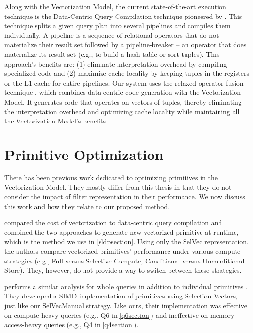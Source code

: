 \documentclass[12pt]{cmuthesis}
\begin{document}
Along with the Vectorization Model, the current state-of-the-art execution technique is the Data-Centric Query Compilation technique pioneered by \citeauthor{hyper_llvm} \cite{hyper_llvm}.  This technique splits a given query plan into several pipelines and compiles them individually. A pipeline is a sequence of relational operators that do not materialize their result set followed by a pipeline-breaker -- an operator that does materialize its result set (e.g., to build a hash table or sort tuples). This approach's benefits are: (1) eliminate interpretation overhead by compiling specialized code and (2) maximize cache locality by keeping tuples in the registers or the L1 cache for entire pipelines. Our system uses the relaxed operator fusion technique \cite{rof}, which combines data-centric code generation with the Vectorization Model. It generates code that operates on vectors of tuples, thereby eliminating the interpretation overhead and optimizing cache locality while maintaining all the Vectorization Model's benefits.


\section{Primitive Optimization}
There has been previous work dedicated to optimizing primitives in the Vectorization Model. They mostly differ from this thesis in that they do not consider the impact of filter representation in their performance. We now discuss this work and how they relate to our proposed method.
 
\citeauthor{sompolski_vec} compared the cost of vectorization to data-centric query compilation \cite{sompolski_vec} and combined the two approaches to generate new vectorized primitive at runtime, which is the method we use in \cref{sldpsection}. Using only the SelVec representation, the authors compare vectorized primitives' performance under various compute strategies (e.g., Full versus Selective Compute, Conditional versus Unconditional Store). They, however, do not provide a way to switch between these strategies. 

\citeauthor{everything_vectorized} performs a similar analysis for whole queries in addition to individual primitives \cite{everything_vectorized}. They developed a SIMD implementation of primitives using Selection Vectors, just like our SelVecManual strategy. Like ours, their implementation was effective on compute-heavy queries (e.g., Q6 in \cref{q6section}) and ineffective on memory access-heavy queries (e.g., Q4 in \cref{q4section}).
\end{document}
